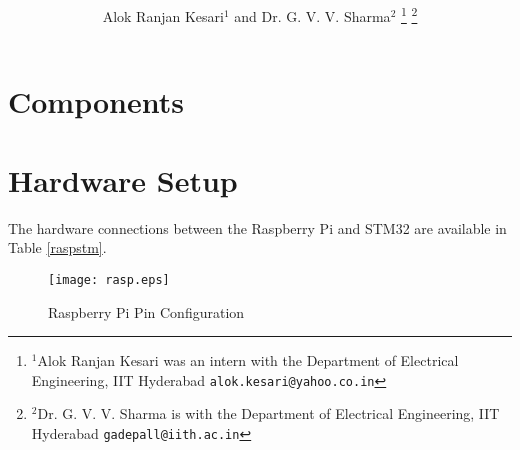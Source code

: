 \documentclass[journal,12pt,twocolumn]{IEEEtran}
\begin{document}

\def\putbox#1#2#3{\makebox[0in][l]{\makebox[#1][l]{}\raisebox{\baselineskip}[0in][0in]{\raisebox{#2}[0in][0in]{#3}}}}
     \def\rightbox#1{\makebox[0in][r]{#1}}
     \def\centbox#1{\makebox[0in]{#1}}
     \def\topbox#1{\raisebox{-\baselineskip}[0in][0in]{#1}}
     \def\midbox#1{\raisebox{-0.5\baselineskip}[0in][0in]{#1}}

\vspace{3cm}

\title{
}%
\author{Alok Ranjan Kesari$^{1}$ and Dr. G. V. V. Sharma$^{2}$%
\thanks{$^{1}$Alok Ranjan Kesari was an intern with the Department of Electrical Engineering, IIT Hyderabad
        {\tt\small alok.kesari@yahoo.co.in}}%
\thanks{$^{2}$Dr. G. V. V. Sharma is with the Department of Electrical Engineering, IIT Hyderabad
        {\tt\small gadepall@iith.ac.in}}%
}



\maketitle


\tableofcontents



\section{Components}
\begin{table}[htbp]
\centering
{}
\label{components}
\end{table}

\section{Hardware Setup}
The hardware connections between the Raspberry Pi and STM32 are available in Table \ref{raspstm}.
\begin{figure}[!h]
\centering
\texttt{[image: rasp.eps]}
\caption{Raspberry Pi Pin Configuration}
\label{rasp}
\end{figure}
\end{document}
